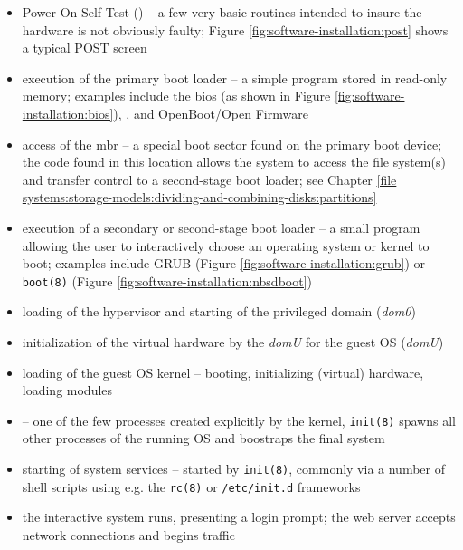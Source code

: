 \begin{itemize}
	\item Power-On Self Test () -- a few very basic routines
		intended to insure the hardware is not obviously faulty;
		Figure \ref{fig:software-installation:post} shows a typical POST screen
	\item execution of the primary boot loader
		-- a simple program stored in read-only memory; examples include
		the \gls{bios} (as shown in Figure
		\ref{fig:software-installation:bios}), ,
		and OpenBoot/Open Firmware
	\item access of the \gls{mbr} -- a special boot sector
		found on the primary boot device; the code found in this
		location allows the system to access the file system(s)
		and transfer control to a second-stage boot loader;
		see Chapter \ref{file systems:storage-models:dividing-and-combining-disks:partitions}
	\item execution of a secondary or second-stage boot loader --
		 a small program allowing
		the user to interactively choose an operating system or
		kernel to boot; examples include GRUB (Figure
		\ref{fig:software-installation:grub}) or
		{\tt boot(8)}
		(Figure  \ref{fig:software-installation:nbsdboot})
	\item loading of the hypervisor and starting
		of the privileged domain ({\em dom0})
	\item initialization of the virtual hardware
		by the {\em domU} for the guest OS ({\em domU})
	\item loading of the guest OS kernel -- booting, initializing (virtual) hardware, loading
		modules
	\item {} -- one of the few processes created
		explicitly by the kernel, {\tt init(8)} spawns all other
		processes of the running OS and boostraps the final system
	\item starting of system services -- started by {\tt init(8)}, commonly via a
		number of shell scripts using e.g. the {\tt rc(8)} or
		{\tt /etc/init.d} frameworks
	\item the interactive system runs, presenting a login prompt; the web server
		accepts network connections and begins traffic
\end{itemize}

